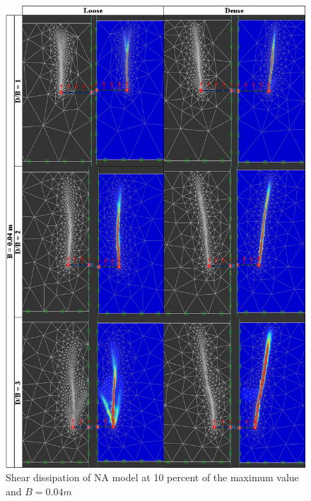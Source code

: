 \documentclass[a4paper, nobind]{templates/ociamthesis}
\begin{document}
\begin{figure}[H]
\includegraphics[width=1\linewidth]{myfigureeeeee/A_point_zero_four_meter} \caption{Shear dissipation of NA model at 10 percent of the maximum value and $B = 0.04m$}\label{fig:unnamed-chunk-25}
\end{figure}
\end{document}
